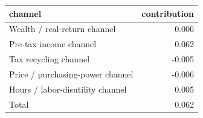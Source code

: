 \begin{tabular}{lr}
\toprule
channel & contribution \\
\midrule
Wealth / real-return channel & 0.006 \\
Pre-tax income channel & 0.062 \\
Tax recycling channel & -0.005 \\
Price / purchasing-power channel & -0.006 \\
Hours / labor-disutility channel & 0.005 \\
Total & 0.062 \\
\bottomrule
\end{tabular}
